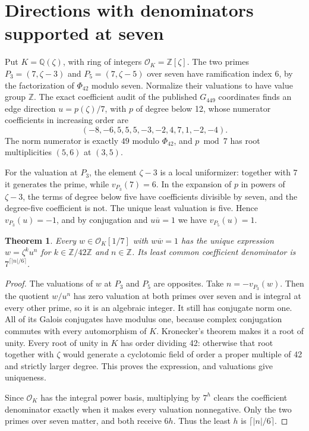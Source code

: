 \documentclass[11pt,letterpaper]{article}
\newtheorem{theorem}{Theorem}
\newcommand{\Z}{\mathbb Z}
\newcommand{\Q}{\mathbb Q}
\begin{document}
\newpage
\section{Directions with denominators supported at seven}

Put $K=\Q(\zeta)$, with ring of integers $\mathcal O_K=\Z[\zeta]$.
The two primes $P_3=(7,\zeta-3)$ and $P_5=(7,\zeta-5)$ over
seven have ramification index 6, by the factorization of
$\Phi_{42}$ modulo seven. Normalize their valuations to have
value group $\Z$. The exact coefficient audit of the published
$G_{449}$ coordinates finds an edge direction
$u=p(\zeta)/7$, with $p$ of degree below 12, whose numerator
coefficients in increasing order are
\[
(-8,-6,5,5,5,-3,-2,4,7,1,-2,-4).
\]
The norm numerator is exactly $49$ modulo $\Phi_{42}$, and
$p\bmod 7$ has root multiplicities $(5,6)$ at $(3,5)$.

For the valuation at $P_3$, the element $\zeta-3$ is a local
uniformizer: together with $7$ it generates the prime, while
$v_{P_3}(7)=6$. In the expansion of $p$ in powers of $\zeta-3$,
the terms of degree below five have coefficients divisible by
seven, and the degree-five coefficient is not. The unique
least valuation is five. Hence $v_{P_3}(u)=-1$, and by conjugation
and $u\overline u=1$ we have $v_{P_5}(u)=1$.

\begin{theorem}
Every $w\in\mathcal O_K[1/7]$ with $w\overline w=1$ has the
unique expression $w=\zeta^k u^n$ for
$k\in\Z/42\Z$ and $n\in\Z$. Its least common coefficient
denominator is $7^{\lceil |n|/6\rceil}$.
\end{theorem}

\begin{proof}
The valuations of $w$ at $P_3$ and $P_5$ are opposites. Take
$n=-v_{P_3}(w)$. Then the quotient $w/u^n$ has zero valuation
at both primes over seven and is integral at every other
prime, so it is an algebraic integer. It still has conjugate
norm one. All of its Galois conjugates have modulus one,
because complex conjugation commutes with every automorphism
of $K$. Kronecker's theorem makes it a root of unity. Every
root of unity in $K$ has order dividing 42: otherwise that
root together with $\zeta$ would generate a cyclotomic field
of order a proper multiple of 42 and strictly larger degree.
This proves the expression, and valuations give uniqueness.

Since $\mathcal O_K$ has the integral power basis, multiplying
by $7^h$ clears the coefficient denominator exactly when it
makes every valuation nonnegative. Only the two primes over
seven matter, and both receive $6h$. Thus the least $h$ is
$\lceil |n|/6\rceil$.
\end{proof}
\end{document}
